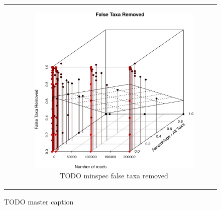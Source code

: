 \begin{figure}
\begin{tabular}{cc}
&

\begin{subfigure}[b]{0.5\textwidth}
\centering
\includegraphics[width=\textwidth]{../polarfront/falsetaxaremoved.png}
\caption{TODO minspec false taxa removed}
\label{fig:minspecvalidationfalsetaxaremoved}
\end{subfigure}
\\

\end{tabular}

\caption{TODO master caption}\label{fig:minspecvalidation}
\end{figure}
